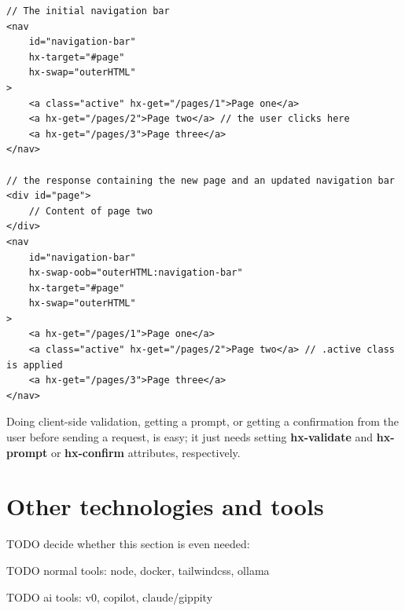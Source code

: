\begin{lstlisting}[caption=Navigation with HTMX out-of-band request,label=lst:htmx-oob, float]
// The initial navigation bar
<nav
    id="navigation-bar"
    hx-target="#page"
    hx-swap="outerHTML"
>
    <a class="active" hx-get="/pages/1">Page one</a>
    <a hx-get="/pages/2">Page two</a> // the user clicks here
    <a hx-get="/pages/3">Page three</a>
</nav>

// the response containing the new page and an updated navigation bar
<div id="page">
    // Content of page two
</div>
<nav
    id="navigation-bar"
    hx-swap-oob="outerHTML:navigation-bar"
    hx-target="#page"
    hx-swap="outerHTML"
>
    <a hx-get="/pages/1">Page one</a>
    <a class="active" hx-get="/pages/2">Page two</a> // .active class is applied
    <a hx-get="/pages/3">Page three</a>
</nav>

\end{lstlisting}

Doing client-side validation, getting a prompt, or getting a confirmation from the user before sending a request, is easy; it just needs setting \textbf{hx-validate} and \textbf{hx-prompt} or \textbf{hx-confirm} attributes, respectively.

\section{Other technologies and tools}

TODO decide whether this section is even needed:

TODO normal tools:
node, docker, tailwindcss, ollama

TODO ai tools:
v0, copilot, claude/gippity

